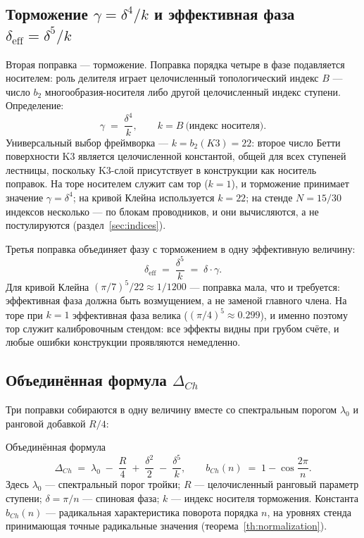 \subsection{Торможение $\gamma=\delta^4/k$ и эффективная фаза
$\delta_{\mathrm{eff}}=\delta^5/k$}

Вторая поправка — торможение. Поправка порядка четыре в фазе
подавляется носителем: роль делителя играет целочисленный
топологический индекс $B$ — число $b_2$ многообразия-носителя либо
другой целочисленный индекс ступени. Определение:
\begin{equation}\label{eq:gamma}
  \gamma \;=\; \frac{\delta^4}{k},
  \qquad k = B\ \text{(индекс носителя)}.
\end{equation}
Универсальный выбор фреймворка — $k=b_2(K3)=22$: второе число Бетти
поверхности K3 является целочисленной константой, общей для всех
ступеней лестницы, поскольку K3-слой присутствует в конструкции как
носитель поправок. На торе носителем служит сам тор ($k=1$), и торможение
принимает значение $\gamma=\delta^4$; на кривой Клейна используется
$k=22$; на стенде $N=15/30$ индексов несколько — по блокам проводников,
и они вычисляются, а не постулируются (раздел~\ref{sec:indices}).

Третья поправка объединяет фазу с торможением в одну эффективную
величину:
\begin{equation}\label{eq:deff}
  \delta_{\mathrm{eff}} \;=\; \frac{\delta^5}{k} \;=\; \delta\cdot\gamma.
\end{equation}
Для кривой Клейна $(\pi/7)^5/22\approx1/1200$ — поправка мала, что и
требуется: эффективная фаза должна быть возмущением, а не заменой
главного члена. На торе при $k=1$ эффективная фаза велика
($(\pi/4)^5\approx0.299$), и именно поэтому тор служит калибровочным
стендом: все эффекты видны при грубом счёте, и любые ошибки конструкции
проявляются немедленно.

\subsection{Объединённая формула $\Delta_{Ch}$}

Три поправки собираются в одну величину вместе со спектральным порогом
$\lambda_0$ и ранговой добавкой $R/4$:
\begin{keybox}{Объединённая формула}
\begin{equation}\label{eq:deltaCh}
  \Delta_{Ch} \;=\; \lambda_0 \;-\; \frac{R}{4}
  \;+\; \frac{\delta^2}{2} \;-\; \frac{\delta^5}{k},
  \qquad
  b_{Ch}(n) \;=\; 1-\cos\frac{2\pi}{n}.
\end{equation}
Здесь $\lambda_0$ — спектральный порог тройки; $R$ — целочисленный
ранговый параметр ступени; $\delta=\pi/n$ — спиновая фаза; $k$ —
индекс носителя торможения. Константа $b_{Ch}(n)$ — радикальная
характеристика поворота порядка $n$, на уровнях стенда принимающая
точные радикальные значения (теорема~\ref{th:normalization}).
\end{keybox}


